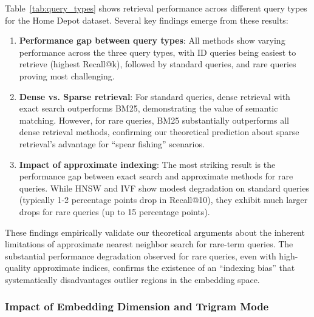\documentclass[sigconf,review]{acmart}
\begin{document}
Table~\ref{tab:query_types} shows retrieval performance across different query types for the Home Depot dataset. Several key findings emerge from these results:

\begin{enumerate}
    \item \textbf{Performance gap between query types}: All methods show varying performance across the three query types, with ID queries being easiest to retrieve (highest Recall@k), followed by standard queries, and rare queries proving most challenging.
    
    \item \textbf{Dense vs. Sparse retrieval}: For standard queries, dense retrieval with exact search outperforms BM25, demonstrating the value of semantic matching. However, for rare queries, BM25 substantially outperforms all dense retrieval methods, confirming our theoretical prediction about sparse retrieval's advantage for ``spear fishing'' scenarios.
    
    \item \textbf{Impact of approximate indexing}: The most striking result is the performance gap between exact search and approximate methods for rare queries. While HNSW and IVF show modest degradation on standard queries (typically 1-2 percentage points drop in Recall@10), they exhibit much larger drops for rare queries (up to 15 percentage points).
\end{enumerate}

These findings empirically validate our theoretical arguments about the inherent limitations of approximate nearest neighbor search for rare-term queries. The substantial performance degradation observed for rare queries, even with high-quality approximate indices, confirms the existence of an ``indexing bias'' that systematically disadvantages outlier regions in the embedding space.

\subsubsection{Impact of Embedding Dimension and Trigram Mode}
\end{document}
